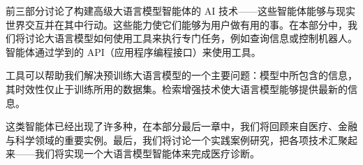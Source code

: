 前三部分讨论了构建高级大语言模型智能体的 AI 技术——这些智能体能够与现实世界交互并在其中行动。这些能力使它们能够为用户做有用的事。在本部分中，我们将讨论大语言模型如何使用工具来执行专门任务，例如查询信息或控制机器人。智能体通过学到的 API（应用程序编程接口）来使用工具。

工具可以帮助我们解决预训练大语言模型的一个主要问题：模型中所包含的信息，其时效性仅止于训练所用的数据集。检索增强技术使大语言模型能够提供最新的信息。  

这类智能体已经出现了许多种，在本部分最后一章中，我们将回顾来自医疗、金融与科学领域的重要实例。最后，我们将讨论一个实践案例研究，把各项技术汇聚起来——我们将实现一个大语言模型智能体来完成医疗诊断。
